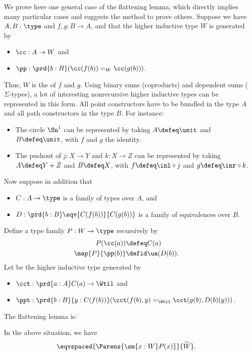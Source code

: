 We prove here one general case of the flattening lemma, which directly implies many particular cases and suggests the method to prove others.
Suppose we have $A,B:\type$ and $f,g:B\to{}A$, and that the higher inductive type $W$ is generated by
\begin{itemize}
\item $\cc:A\to{}W$ and
\item $\pp:\prd{b:B} (\cc(f(b))=_W\cc(g(b)))$.
\end{itemize}
Thus, $W$ is the 
%
%
of $f$ and $g$.
Using binary sums (coproducts) and dependent sums ($\Sigma$-types), a lot of interesting nonrecursive higher
inductive types can be represented in this form. All point constructors have to
be bundled in the type $A$ and all path constructors in the type $B$.
For instance:
\begin{itemize}
\item The circle $\Sn^1$ can be represented by taking $A\defeq \unit$ and $B\defeq \unit$, with $f$ and $g$ the identity.
\item The pushout of $j:X\to Y$ and $k:X\to Z$ can be represented by taking $A\defeq Y+Z$ and $B\defeq X$, with $f\defeq \inl \circ j$ and $g\defeq \inr\circ k$.
\end{itemize}
Now suppose in addition that
\begin{itemize}
\item $C:A\to\type$ is a family of types over $A$, and
\item $D:\prd{b:B}\eqv{C(f(b))}{C(g(b))}$ is a family of equivalences over $B$.
\end{itemize}
Define a type family $P : W\to\type$ recursively by
\begin{align*}
  P(\cc(a)) &\defeq C(a)\\
  \map{P}{\pp(b)} &\defid \ua(D(b)).
\end{align*}
Let \Wtil be the higher inductive type generated by
\begin{itemize}
\item $\cct:\prd{a:A} C(a) \to \Wtil$ and
\item $\ppt:\prd{b:B}{y:C(f(b))} (\cct(f(b),y)=_{\Wtil}\cct(g(b),D(b)(y)))$.
\end{itemize}

The flattening lemma is:

\begin{lem}\label{thm:flattening}
  In the above situation, we have
  \[ \eqvspaced{\Parens{\sm{x:W} P(x)}}{\widetilde{W}}. \]
\end{lem}

